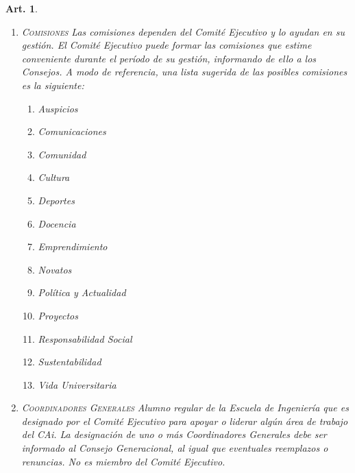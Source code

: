 \documentclass[letterpaper,11pt]{article}
\theoremstyle{plain}
\newtheorem{art}{Art.} %
\begin{document}
\begin{art}
\begin{enumerate}
				\item \textsc{Comisiones} Las comisiones dependen del Comité Ejecutivo y lo ayudan en su gestión. El Comité Ejecutivo puede formar las comisiones que estime conveniente durante el período de su gestión, informando de ello a los Consejos. A modo de referencia, una lista sugerida de las posibles comisiones es la siguiente:
					\begin{enumerate}
						\item Auspicios
						\item Comunicaciones
						\item Comunidad
						\item Cultura
						\item Deportes
						\item Docencia
						\item Emprendimiento
						\item Novatos
						\item Política y Actualidad
						\item Proyectos
						\item Responsabilidad Social
						\item Sustentabilidad
						\item Vida Universitaria
					\end{enumerate}

				\item \textsc{Coordinadores Generales} Alumno regular de la Escuela de Ingeniería que es designado por el Comité Ejecutivo para apoyar o liderar algún área de trabajo del CAi. La designación de uno o más Coordinadores Generales debe ser informado al Consejo Generacional, al igual que eventuales reemplazos o renuncias. No es miembro del Comité Ejecutivo.
			\end{enumerate}
		\end{art}
\end{document}
